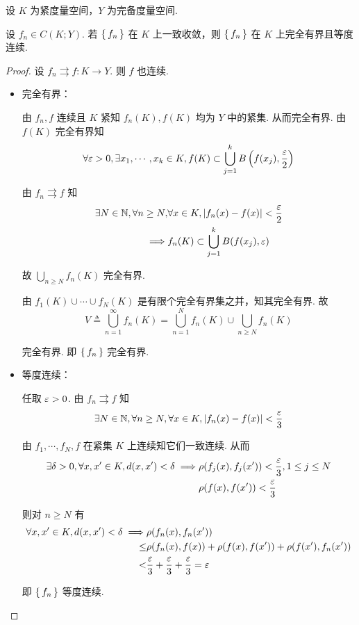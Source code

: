 \begin{lemma}
    设 $K$ 为紧度量空间，$Y$ 为完备度量空间.

    设 $f_n\in C(K;Y)$. 若 $\set{f_n}$ 在 $K$ 上一致收敛，则 $\set{f_n}$ 在 $K$ 上完全有界且等度连续.
\end{lemma}
\begin{proof}
    设 $f_n\rightrightarrows f:K\to Y$. 则 $f$ 也连续.

    \begin{itemize}
        \item 完全有界：
        
        由 $f_n,f$ 连续且 $K$ 紧知 $f_n(K),f(K)$ 均为 $Y$ 中的紧集. 从而完全有界. 由 $f(K)$ 完全有界知
$$
\forall\varepsilon>0,\exists x_1,\cdots,x_k\in K,f(K)\subset\bigcup_{j=1}^kB\left(f(x_j),\frac{\varepsilon}{2}\right)
$$

        由 $f_n\rightrightarrows f$ 知
$$
\begin{aligned}
    \exists N\in\mathbb{N},\forall n\ge N,&\forall x\in K,\left\lvert{f_n(x)-f(x)}\right\rvert<\frac{\varepsilon}{2}\\
    \implies&f_n(K)\subset\bigcup_{j=1}^kB(f(x_j),\varepsilon)
\end{aligned}
$$

        故 $\bigcup\limits_{n\ge N}f_n(K)$ 完全有界.

        由 $f_1(K)\cup\cdots\cup f_N(K)$ 是有限个完全有界集之并，知其完全有界. 故
$$
V\triangleq\bigcup_{n=1}^\infty f_n(K)=\bigcup_{n=1}^Nf_n(K)\cup\bigcup_{n\ge N}f_n(K)
$$

        完全有界. 即 $\set{f_n}$ 完全有界.
        
        \item 等度连续：
        
        任取 $\varepsilon>0$. 由 $f_n\rightrightarrows f$ 知
$$
\exists N\in\mathbb{N},\forall n\ge N,\forall x\in K,\left\lvert{f_n(x)-f(x)}\right\rvert<\frac{\varepsilon}{3}
$$

        由 $f_1,\cdots,f_N,f$ 在紧集 $K$ 上连续知它们一致连续. 从而
$$
\begin{aligned}
    \exists\delta>0,\forall x,x'\in K,d(x,x')<\delta\implies&\rho(f_j(x),f_j(x'))<\frac{\varepsilon}{3},1\le j\le N\\
    &\rho(f(x),f(x'))<\frac{\varepsilon}{3}
\end{aligned}
$$

        则对 $n\ge N$ 有
$$
\begin{aligned}
    \forall x,x'\in K,d(x,x')<\delta\implies&\rho(f_n(x),f_n(x'))\\
    \le&\rho(f_n(x),f(x))+\rho(f(x),f(x'))+\rho(f(x'),f_n(x'))\\
    <&\frac{\varepsilon}{3}+\frac{\varepsilon}{3}+\frac{\varepsilon}{3}=\varepsilon
\end{aligned}
$$

        即 $\set{f_n}$ 等度连续.
    \end{itemize}
\end{proof}

